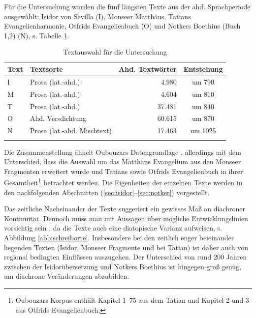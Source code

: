 Für die Untersuchung wurden die fünf längsten Texte aus der ahd. Sprachperiode ausgewählt: Isidor von Sevilla (I), Monseer Matthäus, Tatians Evangelienharmonie, Otfrids Evangelienbuch (O) und Notkers Boethius (Buch 1,2) (N), s. Tabelle  \ref{tab:ddd-auswahl}. 
 
\begin{table}
\centering

\begin{tabular}{llrc}
\lsptoprule
Text                  & Textsorte      & Ahd. Textwörter & Entstehung \\ \midrule
I                      & Prosa (lat.-ahd.)          &   4.980                  & um 790       \\
M         & Prosa (lat.-ahd.)          & 4.604            & um 810              \\
T & Prosa (lat.-ahd.)          & 37.481                  & um 840              \\
O     & Ahd. Versdichtung          & 60.615               & um 870              \\
N   & Prosa (lat.-ahd. Mischtext) &  17.463               & um 1025             \\ \lspbottomrule
\end{tabular}
\caption{Textauswahl für die Untersuchung}
\label{tab:ddd-auswahl}
\end{table}


\noindent 
Die Zusammenstellung ähnelt Oubouzars Datengrundlage \parencite[41f.]{Oubouzar1989}, allerdings mit dem Unterschied, dass die Auswahl um das Matthäus Evangelium aus den Monseer Fragmenten erweitert wurde und Tatians sowie Otfrids Evangelienbuch in ihrer Gesamtheit\footnote{Oubouzars Korpus enthält Kapitel 1--75 aus dem Tatian und Kapitel 2 und 3 aus Otfrids Evangelienbuch.} betrachtet werden.  Die Eigenheiten der einzelnen Texte werden in den nachfolgenden Abschnitten (\ref{sec:isidor}--\ref{sec:notker}) vorgestellt. 

Das zeitliche Nacheinander der Texte suggeriert ein gewisses Maß an diachroner Kontinuität. Dennoch muss man mit Aussagen über mögliche Entwicklungslinien  vorsichtig sein \parencite[vgl. hierzu auch][158]{Leiss2000}, da die Texte auch eine diatopische Varianz aufweisen, s. Abbildung \ref{abb:schreiborte}. Insbesondere bei den zeitlich enger beieinander liegenden Texten (Isidor, Monseer Fragmente und bei Tatian) ist daher auch von regional bedingten Einflüssen auszugehen. Der Unterschied von rund 200 Jahren zwischen der Isidorübersetzung und Notkers Boethius ist hingegen groß genug, um diachrone Veränderungen abzubilden.


